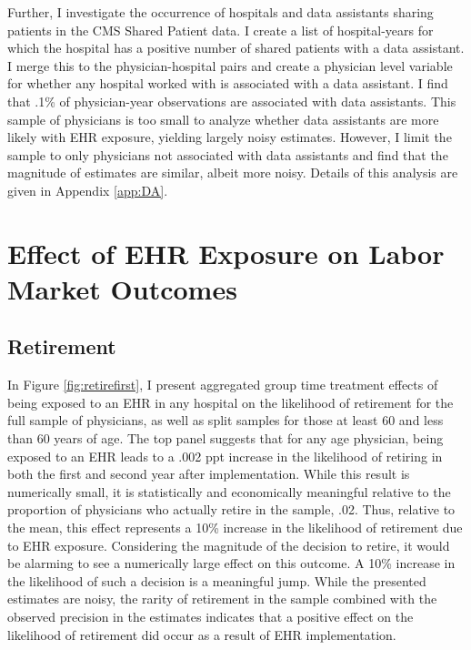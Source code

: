 \documentclass[11pt]{article}
\begin{document}
Further, I investigate the occurrence of hospitals and data assistants sharing patients in the CMS Shared Patient data. I create a list of hospital-years for which the hospital has a positive number of shared patients with a data assistant. I merge this to the physician-hospital pairs and create a physician level variable for whether any hospital worked with is associated with a data assistant. I find that .1\% of physician-year observations are associated with data assistants. This sample of physicians is too small to analyze whether data assistants are more likely with EHR exposure, yielding largely noisy estimates. However, I limit the sample to only physicians not associated with data assistants and find that the magnitude of estimates are similar, albeit more noisy. Details of this analysis are given in Appendix \ref{app:DA}. 





\section{Effect of EHR Exposure on Labor Market Outcomes}

\subsection{Retirement}


In Figure \ref{fig:retirefirst}, I present aggregated group time treatment effects of being exposed to an EHR in any hospital on the likelihood of retirement for the full sample of physicians, as well as split samples for those at least 60 and less than 60 years of age. The top panel suggests that for any age physician, being exposed to an EHR leads to a .002 ppt increase in the likelihood of retiring in both the first and second year after implementation. While this result is numerically small, it is statistically and economically meaningful relative to the proportion of physicians who actually retire in the sample, .02. Thus, relative to the mean, this effect represents a 10\% increase in the likelihood of retirement due to EHR exposure. Considering the magnitude of the decision to retire, it would be alarming to see a numerically large effect on this outcome. A 10\% increase in the likelihood of such a decision is a meaningful jump. While the presented estimates are noisy, the rarity of retirement in the sample combined with the observed precision in the estimates indicates that a positive effect on the likelihood of retirement did occur as a result of EHR implementation.
\end{document}
